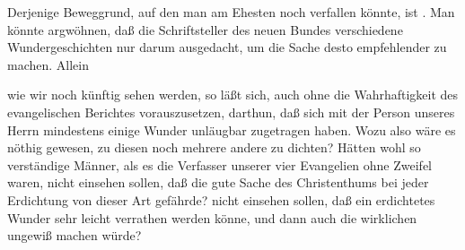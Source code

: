 \begin{aufza}
\item Derjenige Beweggrund, auf den man am Ehesten noch verfallen könnte, ist . Man könnte argwöhnen, daß die Schriftsteller des neuen Bundes verschiedene Wundergeschichten nur darum ausgedacht, um die Sache  desto empfehlender zu machen. Allein
\begin{aufzb}
\item wie wir noch künftig sehen werden, so läßt sich, auch ohne die Wahrhaftigkeit des evangelischen Berichtes vorauszusetzen, darthun, daß sich mit der Person unseres Herrn mindestens einige Wunder unläugbar zugetragen haben. Wozu also wäre es nöthig gewesen, zu diesen noch mehrere andere zu dichten? Hätten wohl so verständige Männer, als es die Verfasser unserer vier Evangelien ohne Zweifel waren, nicht einsehen sollen, daß die gute Sache des Christenthums bei jeder Erdichtung von dieser Art gefährde? nicht einsehen sollen, daß ein erdichtetes Wunder sehr leicht verrathen werden könne, und dann auch die wirklichen ungewiß machen würde?

\end{aufzb}
\end{aufza}
